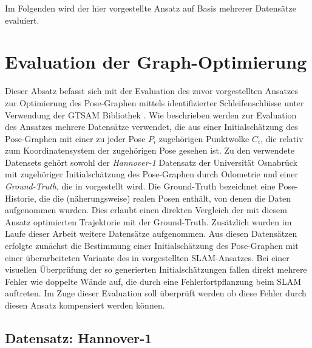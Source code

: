 Im Folgenden wird der hier vorgestellte Ansatz auf Basis mehrerer Datensätze evaluiert.

\section{Evaluation der Graph-Optimierung}

Dieser Absatz befasst sich mit der Evaluation des zuvor vorgestellten Ansatzes zur Optimierung des Pose-Graphen mittels identifizierter Schleifenschlüsse unter Verwendung der GTSAM Bibliothek \cite{dellaert2012factor}. Wie beschrieben werden zur Evaluation des Ansatzes mehrere Datensätze verwendet, die aus einer Initialschätzung des Pose-Graphen mit einer zu jeder Pose $P_i$ zugehörigen Punktwolke $C_i$, die relativ zum Koordinatensystem der zugehörigen Pose gesehen ist. Zu den verwendete Datensets gehört sowohl der \emph{Hannover-1} Datensatz der Universität Osnabrück mit zugehöriger Initialschätzung des Pose-Graphen durch Odometrie und einer \emph{Ground-Truth}, die in \cite{sprickerhof2011heuristic} vorgestellt wird. Die Ground-Truth bezeichnet eine Pose-Historie, die die (näherungsweise) realen Posen enthält, von denen die Daten aufgenommen wurden. Dies erlaubt einen direkten Vergleich der mit diesem Ansatz optimierten Trajektorie mit der Ground-Truth. Zusätzlich wurden im Laufe dieser Arbeit weitere Datensätze aufgenommen. Aus diesen Datensätzen erfolgte zunächst die Bestimmung einer Initialschätzung des Pose-Graphen mit einer überarbeiteten Variante des in \cite{zhang2014loam} vorgestellten SLAM-Ansatzes. Bei einer visuellen Überprüfung der so generierten Initialschätzungen fallen direkt mehrere Fehler wie doppelte Wände auf, die durch eine Fehlerfortpflanzung beim SLAM auftreten. Im Zuge dieser Evaluation soll überprüft werden ob diese Fehler durch diesen Ansatz kompensiert werden können.

\subsection{Datensatz: Hannover-1}



